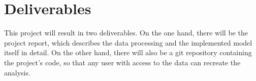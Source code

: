 \documentclass[12pt]{article}
\begin{document}
\section{Deliverables}
This project will result in two deliverables. On the one hand, there will be the project report, which describes the data processing and the implemented model itself in detail. On the other hand, there will also be a git repository containing the project's code, so that any user with access to the data can recreate the analysis.
\newpage

\printbibliography[title={References}]
\end{document}
